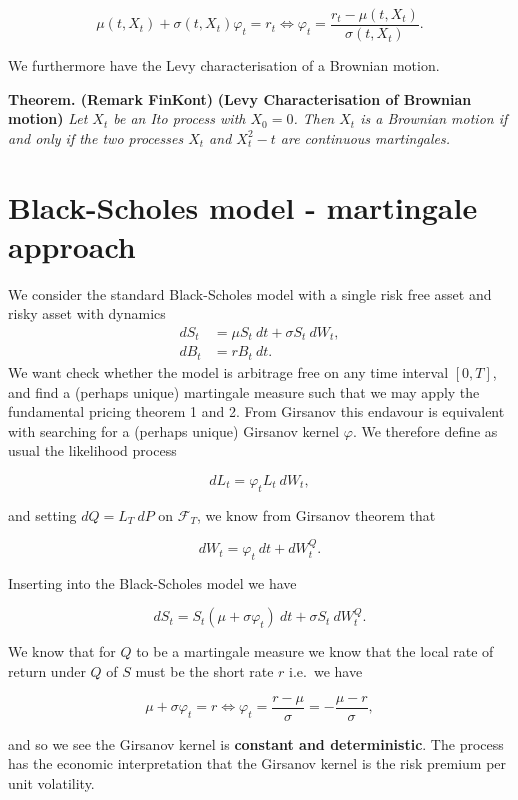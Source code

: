 \documentclass[
]{book}
\begin{document}
\[
\mu(t,X_t)+\sigma(t,X_t)\varphi_t=r_t\iff\varphi_t=\frac{r_t-\mu(t,X_t)}{\sigma(t,X_t)}.
\]

We furthermore have the Levy characterisation of a Brownian motion.

\textbf{Theorem. (Remark FinKont)} \textbf{(Levy Characterisation of Brownian motion)} \emph{Let \(X_t\) be an Ito process with \(X_0=0\). Then \(X_t\) is a Brownian motion if and only if the two processes \(X_t\) and \(X_t^2-t\) are continuous martingales.}

\newpage

\hypertarget{black-scholes-model---martingale-approach}{%
\section{Black-Scholes model - martingale approach}\label{black-scholes-model---martingale-approach}}

We consider the standard Black-Scholes model with a single risk free asset and risky asset with dynamics
\begin{align*}
dS_t &= \mu S_t\ dt+\sigma S_t\ dW_t,\tag{13.1}\\
dB_t &= r B_t\ dt.\tag{13.2}
\end{align*}
We want check whether the model is arbitrage free on any time interval \([0,T]\), and find a (perhaps unique) martingale measure such that we may apply the fundamental pricing theorem 1 and 2. From Girsanov this endavour is equivalent with searching for a (perhaps unique) Girsanov kernel \(\varphi\). We therefore define as usual the likelihood process

\[
dL_t=\varphi_ tL_t\ dW_t,
\]

and setting \(dQ=L_T\ dP\) on \(\mathcal{F}_T\), we know from Girsanov theorem that

\[
dW_t=\varphi_t\ dt+dW_t^Q.
\]

Inserting into the Black-Scholes model we have

\[
dS_t=S_t(\mu + \sigma \varphi_t)\ dt+\sigma S_t\ dW_t^Q.
\]

We know that for \(Q\) to be a martingale measure we know that the local rate of return under \(Q\) of \(S\) must be the short rate \(r\) i.e.~we have

\[
\mu + \sigma \varphi_t=r\iff \varphi_t=\frac{r-\mu}{\sigma}=-\frac{\mu -r}{\sigma},\tag{13.3}
\]

and so we see the Girsanov kernel is \textbf{constant and deterministic}. The process has the economic interpretation that the Girsanov kernel is the risk premium per unit volatility.
\end{document}
